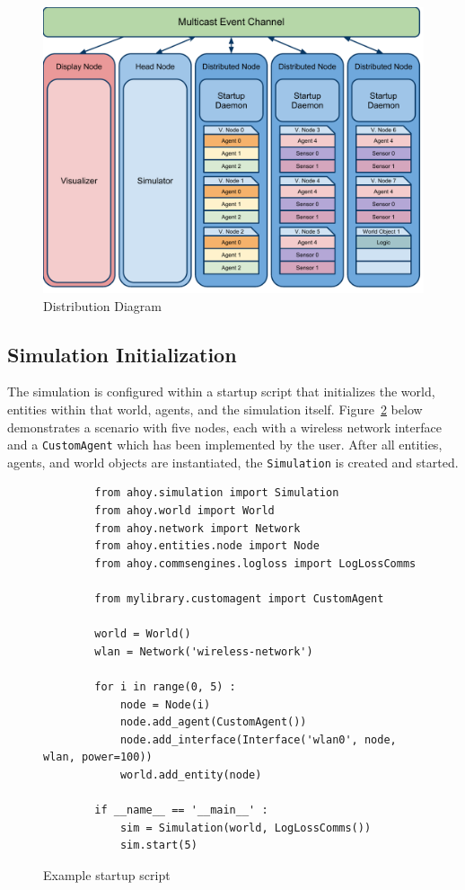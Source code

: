 \documentclass[titlepage]{article}
\begin{document}
\begin{figure}%
    \centering
    \includegraphics[scale=.6]{../initial-pres/arch.pdf}
    \caption{Distribution Diagram}
    \label{fig:distribution}
\end{figure}

\subsection{Simulation Initialization}
The simulation is configured within a startup script that initializes the world, entities within that world, agents, and the simulation itself.  Figure~\ref{fig:exstartup} below demonstrates a scenario with five nodes, each with a wireless network interface and a \texttt{CustomAgent} which has been implemented by the user.  After all entities, agents, and world objects are instantiated, the \texttt{Simulation} is created and started.
\begin{figure}
    \begin{verbatim}
        from ahoy.simulation import Simulation
        from ahoy.world import World
        from ahoy.network import Network
        from ahoy.entities.node import Node
        from ahoy.commsengines.logloss import LogLossComms

        from mylibrary.customagent import CustomAgent

        world = World()
        wlan = Network('wireless-network')

        for i in range(0, 5) :
            node = Node(i)
            node.add_agent(CustomAgent())
            node.add_interface(Interface('wlan0', node, wlan, power=100))
            world.add_entity(node)

        if __name__ == '__main__' :
            sim = Simulation(world, LogLossComms())
            sim.start(5)
    \end{verbatim}
    \caption{Example startup script}
    \label{fig:exstartup}
\end{figure}
\end{document}
